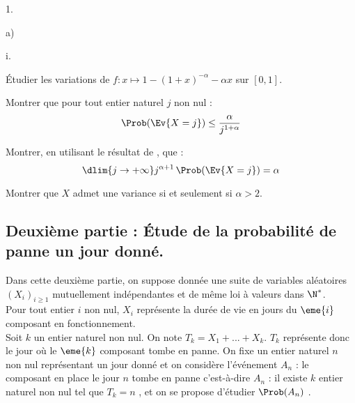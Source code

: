 \begin{noliste}{1.}
\begin{noliste}{a)}
  \item
    \begin{nonoliste}{i.}
    \item Étudier les variations de $f : x \mapsto 1-(1+x)^{-\alpha}-\alpha 
      x$ sur $[0,1]$. 

      
      
    \item Montrer que pour tout entier naturel $j$ non nul :
      \[
      \Prob(\Ev{X=j}) \leq \frac{\alpha}{j^{1+\alpha}}
      \]

      

    \end{nonoliste}



    
  \item Montrer, en utilisant le résultat de , que :
    \[
    \dlim{j \to +\infty} j^{\alpha+1} \, \Prob(\Ev{X=j}) = \alpha
    \]

    

    


  \item Montrer que $X$ admet une variance si et seulement si $\alpha 
    >2$. 

    

  \end{noliste}
\end{noliste}

\subsection*{Deuxième partie : Étude de la probabilité de 
panne un jour donné.}
\noindent
Dans cette deuxième partie, on suppose donnée une suite de variables
aléatoires $(X_i)_{i \geq 1}$ mutuellement indépendantes et de même
loi à valeurs dans $\N^*$.\\
Pour tout entier $i$ non nul, $X_i$ représente la durée de vie en
jours du $\eme{i}$ composant en fonctionnement.\\
Soit $k$ un entier naturel non nul. On note $T_k= X_1+...+X_k$. $T_k$
représente donc le jour où le $\eme{k}$ composant tombe en panne. On
fixe un entier naturel $n$ non nul représentant un jour donné et on
considère l'événement $A_n$ : \og le composant en place le jour $n$
tombe en panne \fg{} c'est-à-dire $A_n$ : \og il existe $k$ entier
naturel non nul tel que $T_k=n$ \fg{}, et on se propose d'étudier
$\Prob(A_n)$ .

